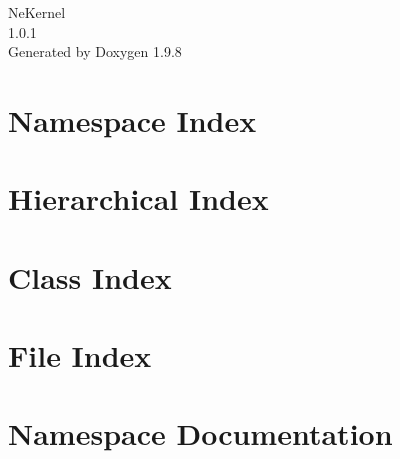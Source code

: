 \documentclass[twoside]{book}
\newcommand{\+}{\discretionary{\mbox{\scriptsize$\hookleftarrow$}}{}{}}
\newcommand{\clearemptydoublepage}{%
    \newpage{\pagestyle{empty}\cleardoublepage}%
  }
\begin{document}
  \raggedbottom
    \hypersetup{pageanchor=false,
                bookmarksnumbered=true,
                pdfencoding=unicode
               }
  \begin{titlepage}
  \vspace*{7cm}
  \begin{center}%
  {\Large Ne\+Kernel}\\
  [1ex]\large 1.\+0.\+1 \\
  \vspace*{1cm}
  {\large Generated by Doxygen 1.9.8}\\
  \end{center}
  \end{titlepage}
  \clearemptydoublepage
  \tableofcontents
  \clearemptydoublepage
  \hypersetup{pageanchor=true}


\chapter{Namespace Index}

\chapter{Hierarchical Index}

\chapter{Class Index}

\chapter{File Index}

\chapter{Namespace Documentation}





























\end{document}
